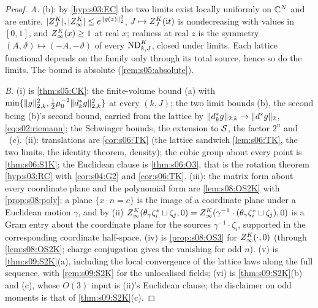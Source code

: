 \begin{proof}
\emph{A.} (b): by \cref{hyp:s03:EC} the two limits exist locally uniformly on $\mathbb C^N$ and are entire, $|Z^{K}_{J}|,|Z^{K}_{\infty}|\le e^{\lVert g(z)\rVert_2^2}$, $J\mapsto Z^{K}_{J}(\mathrm it)$ is nondecreasing with values in $[0,1]$, and $Z^{K}_{\infty}(x)\ge1$ at real $x$; realness at real $z$ is the symmetry $(A,\vartheta)\mapsto(-A,-\vartheta)$ of every $\mathrm{ND}^{K}_{k,J}$, closed under limits. Each lattice functional depends on the family only through its total source, hence so do the limits. The bound is absolute (\cref{rem:s05:absolute}).

\emph{B.} (i) is \cref{thm:s05:CK}: the finite-volume bound (a) with $\min\{\lVert g\rVert^2_{2,k},\frac12\mu_0^{-2}\lVert d^{*}_kg\rVert^2_{2,k}\}$ at every $(k,J)$; the two limit bounds (b), the second being (b)'s second bound, carried from the lattice by $\lVert d^{*}_kg\rVert_{2,k}\to\lVert d^{*} g\rVert_2$, \eqref{eq:s02:riemann}; the Schwinger bounds, the extension to $\mathcal S$, the factor $2^n$ and \Ezz\ (c). (ii): translations are \cref{cor:s06:TK} (the lattice sandwich \cref{lem:s06:TK}, the two limits, the identity theorem, density); the cubic group about every point is \cref{thm:s06:S1K}; the Euclidean clause is \cref{thm:s06:O3}, that is the rotation theorem \cref{hyp:s03:RC} with \cref{cor:s04:G2} and \cref{cor:s06:TK}. (iii): the matrix form about every coordinate plane and the polynomial form are \cref{lem:s08:OS2K} with \cref{prop:s08:poly}; a plane $\{x\cdot n=c\}$ is the image of a coordinate plane under a Euclidean motion $\gamma$, and by (ii) $Z^{K}_{\infty}(\theta_\gamma\zeta_i^*\sqcup\zeta_j,0)=Z^{K}_{\infty}(\gamma^{-1}\cdot(\theta_\gamma\zeta_i^*\sqcup\zeta_j),0)$ is a Gram entry about the coordinate plane for the sources $\gamma^{-1}\cdot\zeta_i$, supported in the corresponding coordinate half-space. (iv) is \cref{prop:s08:OS3} for $Z^{K}_{\infty}(\cdot,0)$ (through \cref{lem:s08:OS2K}; charge conjugation gives the vanishing for odd $n$). (v) is \cref{thm:s09:S2K}(a), including the local convergence of the lattice laws along the full sequence, with \cref{rem:s09:S2K} for the unlocalised fields; (vi) is \cref{thm:s09:S2K}(b) and (c), whose $O(3)$ input is (ii)'s Euclidean clause; the disclaimer on odd moments is that of \cref{thm:s09:S2K}(c).


\end{proof}
